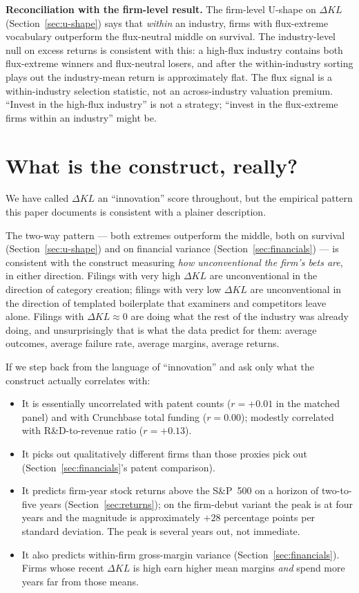 \documentclass[11pt]{article}
\begin{document}
\textbf{Reconciliation with the firm-level result.} The firm-level
U-shape on $\Delta KL$ (Section~\ref{sec:u-shape}) says that
\emph{within} an industry, firms with flux-extreme vocabulary
outperform the flux-neutral middle on survival. The industry-level
null on excess returns is consistent with this: a high-flux
industry contains both flux-extreme winners and flux-neutral losers,
and after the within-industry sorting plays out the industry-mean
return is approximately flat. The flux signal is a within-industry
selection statistic, not an across-industry valuation premium.
``Invest in the high-flux industry'' is not a strategy; ``invest in
the flux-extreme firms within an industry'' might be.

\section{What is the construct, really?}
\label{sec:construct}

We have called $\Delta KL$ an ``innovation'' score throughout, but
the empirical pattern this paper documents is consistent with a
plainer description.

The two-way pattern --- both extremes outperform the middle, both
on survival
(Section~\ref{sec:u-shape}) and on financial variance
(Section~\ref{sec:financials}) --- is consistent with the
construct measuring \emph{how unconventional the firm's bets are},
in either direction. Filings with very high $\Delta KL$ are
unconventional in the direction of category creation; filings with
very low $\Delta KL$ are unconventional in the direction of
templated boilerplate that examiners and competitors leave alone.
Filings with $\Delta KL \approx 0$ are doing what the rest of the
industry was already doing, and unsurprisingly that is what the
data predict for them: average outcomes, average failure rate,
average margins, average returns.

If we step back from the language of ``innovation'' and ask only
what the construct actually correlates with:
\begin{itemize}
  \item It is essentially uncorrelated with patent counts ($r =
        +0.01$ in the matched panel) and with Crunchbase total
        funding ($r = 0.00$); modestly correlated with R\&D-to-revenue
        ratio ($r = +0.13$).
  \item It picks out qualitatively different firms than those
        proxies pick out (Section~\ref{sec:financials}'s patent
        comparison).
  \item It predicts firm-year stock returns above the S\&P~500 on
        a horizon of two-to-five years
        (Section~\ref{sec:returns}); on the firm-debut variant the
        peak is at four years and the magnitude is approximately
        $+28$ percentage points per standard deviation. The peak
        is several years out, not immediate.
  \item It also predicts within-firm gross-margin variance
        (Section~\ref{sec:financials}). Firms whose recent
        $\Delta KL$ is high earn higher mean margins \emph{and}
        spend more years far from those means.
\end{itemize}
\end{document}

